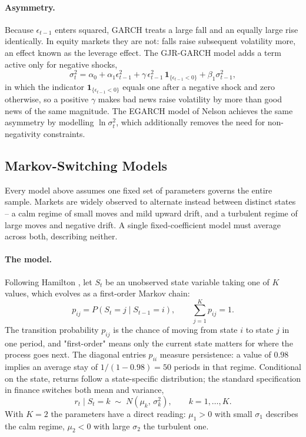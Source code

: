 \documentclass[12pt,a4paper]{article}
\begin{document}
\paragraph{Asymmetry.} Because $\epsilon_{t-1}$ enters squared, GARCH treats a
large fall and an equally large rise identically. In equity markets they are
not: falls raise subsequent volatility more, an effect known as the leverage
effect. The GJR-GARCH model adds a term active only for negative shocks,
\begin{equation}
\sigma_t^{2} = \alpha_0 + \alpha_1\epsilon_{t-1}^{2}
+ \gamma\,\epsilon_{t-1}^{2}\,\mathbf{1}_{\{\epsilon_{t-1}<0\}}
+ \beta_1\sigma_{t-1}^{2},
\end{equation}
in which the indicator $\mathbf{1}_{\{\epsilon_{t-1}<0\}}$ equals one after a
negative shock and zero otherwise, so a positive $\gamma$ makes bad news raise
volatility by more than good news of the same magnitude. The EGARCH model of
Nelson \cite{Nelson_1991} achieves the same asymmetry by modelling
$\ln \sigma_t^2$, which additionally removes the need for non-negativity
constraints.

\subsection{Markov-Switching Models}

Every model above assumes one fixed set of parameters governs the entire
sample. Markets are widely observed to alternate instead between distinct
states -- a calm regime of small moves and mild upward drift, and a turbulent
regime of large moves and negative drift. A single fixed-coefficient model
must average across both, describing neither.

\paragraph{The model.} Following Hamilton \cite{Hamilton_1989}, let $S_t$ be
an unobserved state variable taking one of $K$ values, which evolves as a
first-order Markov chain:
\begin{equation}
p_{ij} = P(S_t = j \mid S_{t-1} = i),
\qquad \sum_{j=1}^{K} p_{ij} = 1 .
\end{equation}
The transition probability $p_{ij}$ is the chance of moving from state $i$ to
state $j$ in one period, and "first-order" means only the current state
matters for where the process goes next. The diagonal entries $p_{ii}$ measure
persistence: a value of $0.98$ implies an average stay of $1/(1-0.98) = 50$
periods in that regime. Conditional on the state, returns follow a
state-specific distribution; the standard specification in finance switches
both mean and variance,
\begin{equation}
r_t \mid S_t = k \;\sim\; N\!\left(\mu_k,\, \sigma_k^{2}\right),
\qquad k = 1,\dots,K .
\end{equation}
With $K=2$ the parameters have a direct reading: $\mu_1 > 0$ with small
$\sigma_1$ describes the calm regime, $\mu_2 < 0$ with large $\sigma_2$ the
turbulent one.
\end{document}
